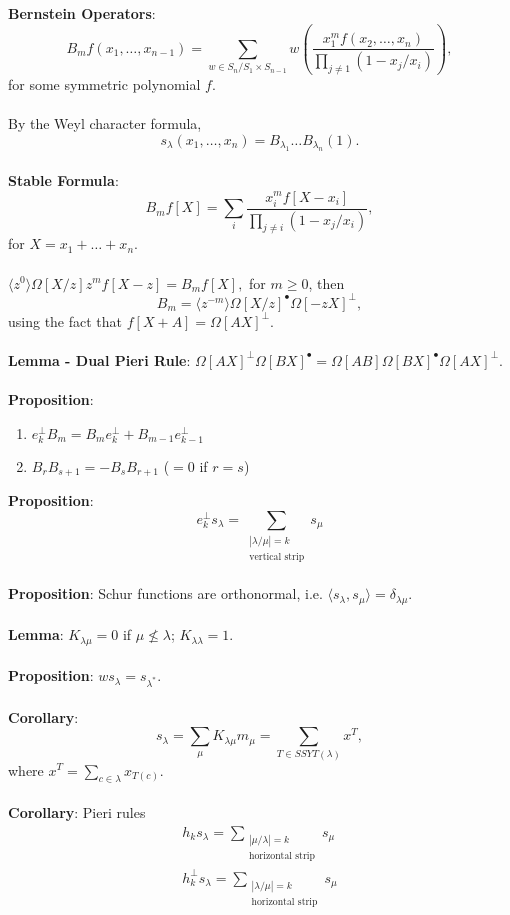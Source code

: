 \documentclass{article}
\begin{document}
\textbf{Bernstein Operators}: $$B_m f(x_1, \dots, x_{n - 1}) = \sum_{w \in S_n / S_1 \times S_{n - 1}} w \left( \frac{x_1^m f(x_2, \dots, x_n)}{\prod_{j \neq 1} (1 - x_j/x_i)} \right),$$ for some symmetric polynomial $f$. \\ \\
By the Weyl character formula, $$s_\lambda(x_1, \dots, x_n) = B_{\lambda_1} \dots B_{\lambda_n} (1).$$ \\
\textbf{Stable Formula}: $$B_m f[X] = \sum_i \frac{x_i^m f[X - x_i]}{\prod_{j \neq i} (1 - x_j/x_i)},$$ for $X = x_1 + \dots + x_n$. \\ \\
$\langle z^0 \rangle \Omega[X/z] z^m f[X - z] = B_m f[X],$ for $m \geq 0$, then $$B_m = \langle z^{-m} \rangle \Omega[X/z]^\bullet \Omega[-zX]^\perp,$$ using the fact that $f[X + A] = \Omega[AX]^\perp$. \\ \\
\textbf{Lemma - Dual Pieri Rule}: $\Omega[AX]^\perp \Omega[BX]^\bullet = \Omega[AB] \Omega[BX]^\bullet \Omega[AX]^\perp$. \\ \\
\textbf{Proposition}: \begin{enumerate}
    \item $e_k^\perp B_m = B_m e_k^\perp + B_{m - 1}e_{k - 1}^\perp$
    \item $B_r B_{s + 1} = -B_s B_{r + 1}$ ($ = 0$ if $r = s$)
\end{enumerate} $ $ \\
\textbf{Proposition}: $$e_k^\perp s_\lambda = \sum_{\substack{{|\lambda / \mu| = k} \\ {\text{vertical strip}}}} s_\mu$$ \\
\textbf{Proposition}: Schur functions are orthonormal, i.e. $\langle s_\lambda, s_\mu \rangle = \delta_{\lambda \mu}$. \\ \\
\textbf{Lemma}: $K_{\lambda \mu} = 0$ if $\mu \not\leq \lambda$; $K_{\lambda \lambda} = 1$. \\ \\
\textbf{Proposition}: $ws_\lambda = s_{\lambda^*}$. \\ \\
\textbf{Corollary}: $$s_\lambda = \sum_\mu K_{\lambda \mu} m_\mu = \sum_{T \in SSYT(\lambda)} x^T,$$ where $x^T = \sum_{c \in \lambda} x_{T(c)}$. \\ \\
\textbf{Corollary}: Pieri rules \begin{align*}
    h_k s_\lambda = \sum_{\substack{{|\mu / \lambda| = k} \\ {\text{horizontal strip}}}} s_\mu \\
    h_k^\perp s_\lambda = \sum_{\substack{{|\lambda / \mu| = k} \\ {\text{horizontal strip}}}} s_\mu
\end{align*} $ $ \\
\end{document}
